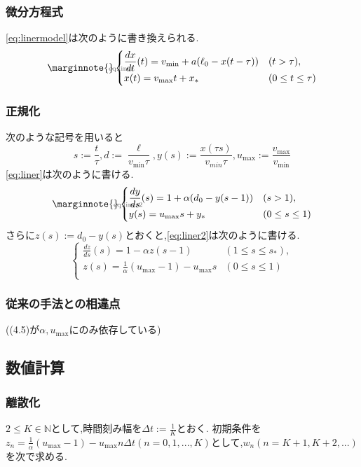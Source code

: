 \documentclass [dvipdfmx] {jsarticle}
\makeatletter
\let\temp@label\label
\def\label#1{\marginnote{\hbox to 0pt{\scriptsize \textcolor{black!60}{#1}\hss}}\temp@label{#1}\ignorespaces}
\numberwithin{equation}{section}
\theoremstyle{definition} %
\theoremstyle{definition} %
\makeatother
\begin{document}
\subsubsection{微分方程式}
\eqref{eq:linermodel}は次のように書き換えられる.
\begin{equation}\label{eq:liner}\begin{cases}
    \displaystyle\frac{dx}{dt}(t)=v_{\min}+a(\ell_0-x(t-\tau)) &(t>\tau),\\
    x(t)=v_{\max}t+x_\ast &(0\le t \le \tau)
\end{cases}\end{equation}
\subsubsection{正規化}
次のような記号を用いると
\begin{equation}
    s:=\displaystyle\frac{t}{\tau},d:=\frac{\ell}{v_{\min}\tau},
    y(s):=\displaystyle\frac{x(\tau s)}{v_{min}\tau},
    u_{\max}:=\displaystyle\frac{v_{\max}}{v_{\min}}
\end{equation}
\eqref{eq:liner}は次のように書ける.
\begin{equation}\label{eq:liner2}\begin{cases}
    \displaystyle\frac{dy}{ds}(s)=1+\alpha(d_0-y(s-1)) &(s>1),\\
    y(s)=u_{\max}s+y_\ast &(0\le s \le 1)
\end{cases}\end{equation}
さらに$z(s):=d_0-y(s)$とおくと,\eqref{eq:liner2}は次のように書ける.
\begin{equation}\begin{cases}
    \displaystyle\frac{dz}{ds}(s)=1-\alpha z(s-1) &(1\le s\le s_\ast),\\
    z(s)=\displaystyle\frac{1}{\alpha}(u_{\max}-1)-u_{\max}s &(0\le s\le 1)\\
\end{cases}\end{equation}
\subsubsection{従来の手法との相違点}
((4.5)が$\alpha,u_{\max}$にのみ依存している)
\subsection{数値計算}
\subsubsection{離散化}
$2\le K\in\mathbb{N}$として,時間刻み幅を$\Delta t:=\frac{1}{K}$とおく.
初期条件を$z_n=\frac{1}{\alpha}(u_\max-1)-u_\max n \Delta t (n=0,1,...,K)$として,$w_n(n=K+1,K+2,...)$
を次で求める.
\begin{equation}
    
\end{equation}
\end{document}
